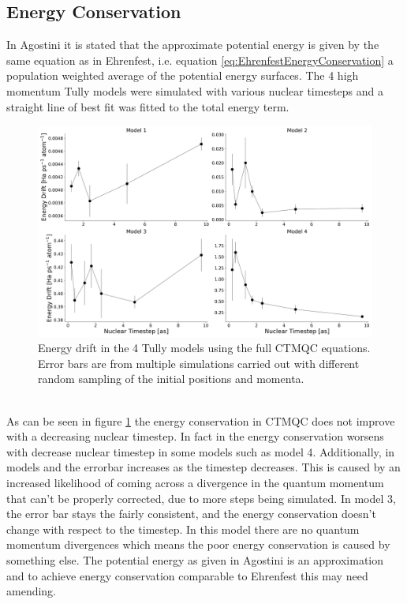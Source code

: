 \subsection{Energy Conservation}
In Agostini \cite{agostini_quantum-classical_2016} it is stated that the approximate potential energy is given by the same equation as in Ehrenfest, i.e. equation \eqref{eq:EhrenfestEnergyConservation} a population weighted average of the potential energy surfaces. The 4 high momentum Tully models were simulated with various nuclear timesteps and a straight line of best fit was fitted to the total energy term.
\begin{figure}[ht]
  \includegraphics[width=\textwidth]{../img/CTMQC/TullyModels/CTMQC_EnerCons.png}
  \caption{\label{fig:CTMQC_EnergyCons}Energy drift in the 4 Tully models using the full CTMQC equations. Error bars are from multiple simulations carried out with different random sampling of the initial positions and momenta.}
\end{figure}
\\
As can be seen in figure \ref{fig:CTMQC_EnergyCons} the energy conservation in CTMQC does not improve with a decreasing nuclear timestep. In fact in the energy conservation worsens with decrease nuclear timestep in some models such as model 4. Additionally, in models  and  the errorbar increases as the timestep decreases. This is caused by an increased likelihood of coming across a divergence in the quantum momentum that can't be properly corrected, due to more steps being simulated. In model 3, the error bar stays the fairly consistent, and the energy conservation doesn't change with respect to the timestep. In this model there are no quantum momentum divergences which means the poor energy conservation is caused by something else. The potential energy as given in Agostini \cite{agostini_quantum-classical_2016} is an approximation and to achieve energy conservation comparable to Ehrenfest this may need amending.

